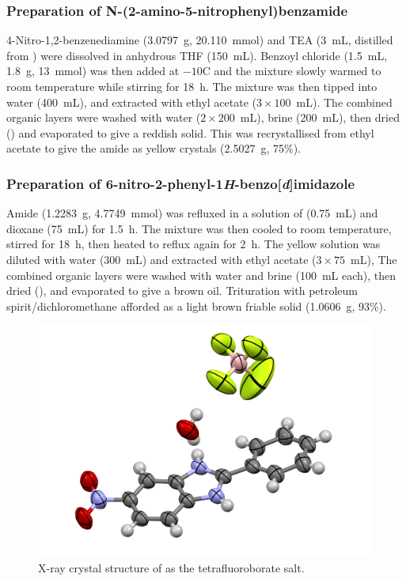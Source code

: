 \subsubsection{Preparation of N-(2-amino-5-nitrophenyl)benzamide }
4-Nitro-1,2-benzenediamine (3.0797~g, 20.110~mmol) and TEA (3~mL, distilled from ) were dissolved in anhydrous THF (150~mL).
Benzoyl chloride (1.5~mL, 1.8~g, 13~mmol) was then added at $-10$\degree C and the mixture slowly warmed to room temperature while stirring for 18~h.
The mixture was then tipped into water (400~mL), and extracted with ethyl acetate ($3\times100$~mL).
The combined organic layers were washed with water ($2\times200$~mL), brine (200~mL), then dried () and evaporated to give a reddish solid.
This was recrystallised from ethyl acetate to give the amide  as yellow crystals (2.5027~g, 75\%).

\subsubsection{Preparation of 6-nitro-2-phenyl-1\emph{H}-benzo[\emph{d}]imidazole }
Amide  (1.2283~g, 4.7749~mmol) was refluxed in a solution of  (0.75~mL) and dioxane (75~mL) for 1.5~h. 
The mixture was then cooled to room temperature, stirred for 18~h, then heated to reflux again for 2~h.
The yellow solution was diluted with water (300~mL) and extracted with ethyl acetate ($3\times75$~mL),
The combined organic layers were washed with water and brine (100~mL each), then dried (), and evaporated to give a brown oil.
Trituration with petroleum spirit/dichloromethane afforded  as a light brown friable solid (1.0606~g, 93\%).

\begin{figure}[h]
    \centering
    \includegraphics[width=0.8\linewidth]{Figures/rhs-nitro-xray.png}
    \caption{X-ray crystal structure of  as the tetrafluoroborate salt.}
    \label{fig:rhs-nitro-xray}
\end{figure}

